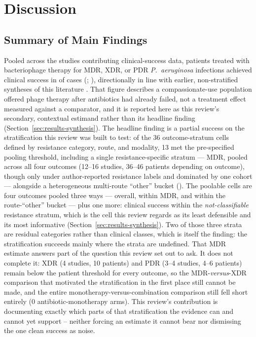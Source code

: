 \section{Discussion}
\label{sec:discussion}

\subsection{Summary of Main Findings}
\label{sec:discussion-summary}

Pooled across the \CsOverallK studies contributing clinical-success data, patients treated with bacteriophage therapy for MDR, XDR, or PDR \textit{P.\ aeruginosa} infections achieved clinical success in \CsOverallEst of cases (\CsOverallCI; ), directionally in line with earlier, non-stratified syntheses of this literature \parencite{ElHaddad2019_eskape,Uyttebroek2022_lancetid,Liu2025_ijaa}. That figure describes a compassionate-use population offered phage therapy after antibiotics had already failed, not a treatment effect measured against a comparator, and it is reported here as this review's secondary, contextual estimand rather than its headline finding (Section~\ref{sec:results-synthesis}). The headline finding is a partial success on the stratification this review was built to test: of the 36 outcome-stratum cells defined by resistance category, route, and modality, 13 met the pre-specified pooling threshold, including a single resistance-specific stratum --- MDR, pooled across all four outcomes (12--16 studies, 36--46 patients depending on outcome), though only under author-reported resistance labels and dominated by one cohort --- alongside a heterogeneous multi-route ``other'' bucket (). The \CellsPooled poolable cells are four outcomes pooled three ways --- overall, within MDR, and within the route-``other'' bucket --- plus one more: clinical success within the \emph{not-classifiable} resistance stratum, which is the cell this review regards as its least defensible and its most informative (Section~\ref{sec:results-synthesis}). Two of those three strata are residual categories rather than clinical classes, which is itself the finding: the stratification succeeds mainly where the strata are undefined. That MDR estimate answers part of the question this review set out to ask. It does not complete it: XDR (4 studies, 10 patients) and PDR (3--4 studies, 4--6 patients) remain below the patient threshold for every outcome, so the MDR-\emph{versus}-XDR comparison that motivated the stratification in the first place still cannot be made, and the entire monotherapy-versus-combination comparison still fell short entirely (0 antibiotic-monotherapy arms). This review's contribution is documenting exactly which parts of that stratification the evidence can and cannot yet support -- neither forcing an estimate it cannot bear nor dismissing the one clean success as noise.

